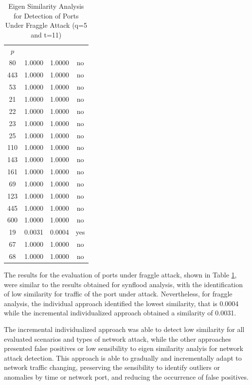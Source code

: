 \begin{table}[h!]
  \centering
  \caption{Eigen Similarity Analysis for Detection of Ports Under Fraggle Attack (q=5 and t=11)}
  \label{tab:2.10}
  \begin{tabular}{ c c c c }
	\toprule
	\multirow{2}{*}{\pmb{Port} $p$}   &\multicolumn{2}{c}{\pmb{Approaches}} &\multirow{2}{*}{\pmb{Ground Truth}}\\ 
			\hhline{~--~}
			&\pmb{Incremental Individualized} &\pmb{Individual}\\
	\midrule
	80 &1.0000 &1.0000 &no \\
	443 &1.0000 &1.0000 &no \\
	53 &1.0000 &1.0000 &no \\
	21 &1.0000 &1.0000 &no \\
	22 &1.0000 &1.0000 &no \\
	23 &1.0000 &1.0000 &no \\
	25 &1.0000 &1.0000 &no \\
	110 &1.0000 &1.0000 &no \\
	143 &1.0000 &1.0000 &no \\
	161 &1.0000 &1.0000 &no \\
	69 &1.0000 &1.0000 &no \\
	123 &1.0000 &1.0000 &no \\
	445 &1.0000 &1.0000 &no \\
	600 &1.0000 &1.0000 &no \\
	19 &0.0031 &0.0004 &yes \\
	67 &1.0000 &1.0000 &no \\
	68 &1.0000 &1.0000 &no \\
    \bottomrule
  \end{tabular}
\end{table}

The results for the evaluation of ports under fraggle attack, shown in Table \ref{tab:2.10}, were similar to the results obtained for synflood analysis, with the identification of low similarity for traffic of the port under attack. Nevertheless, for fraggle analysis, the individual approach identified the lowest similarity, that is 0.0004 while the incremental individualized approach obtained a similarity of 0.0031.

The incremental individualized approach was able to detect low similarity for all evaluated scenarios and types of network attack, while the other approaches presented false positives or low sensibility to eigen similarity analyis for network attack detection. This approach is able to gradually and incrementally adapt to network traffic changing, preserving the sensibility to identify outliers or anomalies by time or network port, and reducing the occurrence of false positives.


